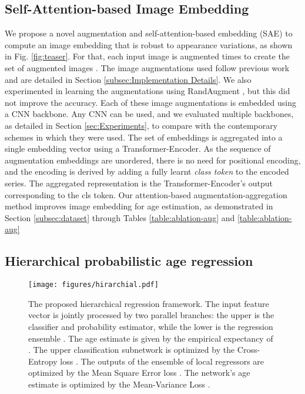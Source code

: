 \documentclass[10pt,journal]{IEEEtran}\usepackage{amsfonts}
\begin{document}
\subsection{Self-Attention-based Image Embedding}

\label{subsec:self-atten}

We propose a novel augmentation and self-attention-based embedding (SAE) to
compute an image embedding that is robust to appearance variations, as shown
in Fig. \ref{fig:teaser}. For that, each input image  is augmented
 times to create the set of augmented images . The image augmentations used follow
previous work and are detailed in Section \ref{subsec:Implementation Details}.
We also experimented in learning the augmentations using RandAugment
\cite{Randaugment}, but this did not improve the accuracy. Each of these image
augmentations  is embedded using
a CNN backbone. Any CNN can be used, and we evaluated multiple backbones, as
detailed in Section \ref{sec:Experiments}, to compare with the contemporary
schemes in which they were used. The set of embeddings  is aggregated into a single embedding
vector  using a Transformer-Encoder. As the sequence of
augmentation embeddings are unordered, there is no need for positional
encoding, and the encoding is derived by adding a fully learnt \textit{class
token}  to the encoded series. The aggregated
representation  is the Transformer-Encoder's output
corresponding to the cls token. Our attention-based augmentation-aggregation
method improves image embedding for age estimation, as demonstrated in Section
\ref{subsec:dataset} through Tables \ref{table:ablation-aug} and
\ref{table:ablation-aug}

\subsection{Hierarchical probabilistic age regression}

\label{subsec:regression} \begin{figure*}[tbh]
\begin{center}
\centering\texttt{[image: figures/hirarchial.pdf]}
\end{center}
\caption{The proposed hierarchical regression framework. The input feature
vector  is jointly processed by two parallel branches: the
upper is the classifier and probability estimator, while the lower is the
regression ensemble . The age estimate  is given by the
empirical expectancy of .
The upper classification subnetwork is optimized by the Cross-Entropy loss
. The outputs of the ensemble of local regressors are optimized by the
Mean Square Error loss . The network's age estimate  is optimized by the Mean-Variance Loss \cite{Mean-Variance}
. }\label{fig:hierarichal}\end{figure*}
\end{document}
